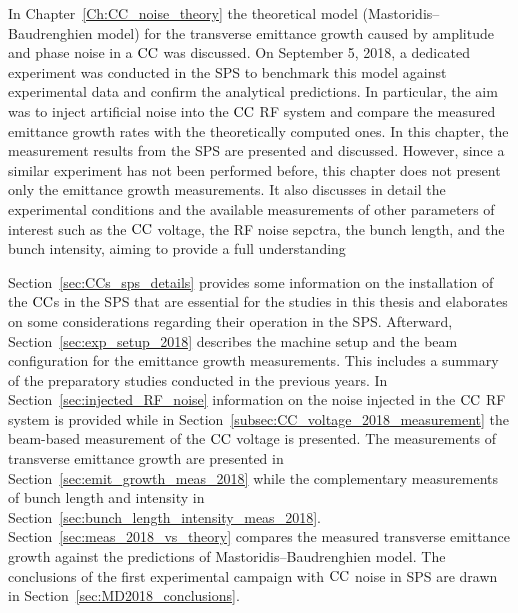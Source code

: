 \vspace*{-1mm}
In Chapter~\ref{Ch:CC_noise_theory} the theoretical model (Mastoridis--Baudrenghien model) for the transverse emittance growth caused by amplitude and phase noise in a ${\mathrm{CC}}$ was discussed. On September 5, 2018, a dedicated experiment was conducted in the SPS to benchmark this model against experimental data and confirm the analytical predictions. In particular, the aim was to inject artificial noise into the ${\mathrm{CC}}$ RF system and compare the measured emittance growth rates with the theoretically computed ones. In this chapter, the measurement results from the SPS are presented and discussed. However, since a similar experiment has not been performed before, this chapter does not present only the emittance growth measurements. It also discusses in detail the experimental conditions and the available measurements of other parameters of interest such as the ${\mathrm{CC}}$ voltage, the RF noise sepctra, the bunch length, and the bunch intensity, aiming to provide a full understanding


Section~\ref{sec:CCs_sps_details} provides some information on the installation of the ${\mathrm{CC}}$s in the SPS that are essential for the studies in this thesis and elaborates on some considerations regarding their operation in the SPS. Afterward, Section~\ref{sec:exp_setup_2018} describes the machine setup and the beam configuration for the emittance growth measurements. This includes a summary of the preparatory studies conducted in the previous years. In Section~\ref{sec:injected_RF_noise} information on the noise injected in the ${\mathrm{CC}}$ RF system is provided while in Section~\ref{subsec:CC_voltage_2018_measurement} the beam-based measurement of the ${\mathrm{CC}}$ voltage is presented. The measurements of transverse emittance growth are presented in Section~\ref{sec:emit_growth_meas_2018} while the complementary measurements of bunch length and intensity in Section~\ref{sec:bunch_length_intensity_meas_2018}. Section~\ref{sec:meas_2018_vs_theory} compares the measured transverse emittance growth against the predictions of Mastoridis--Baudrenghien model. The conclusions of the first experimental campaign with ${\mathrm{CC}}$ noise in SPS are drawn in Section~\ref{sec:MD2018_conclusions}.

